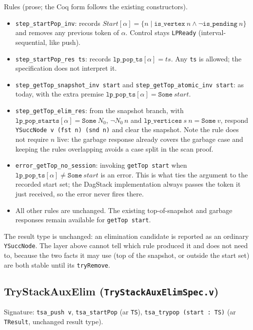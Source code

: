 \documentclass[11pt]{article}
\theoremstyle{definition}
\theoremstyle{remark}
\newcommand{\code}[1]{\texttt{#1}}
\newcommand{\file}[1]{\texttt{#1}}
\newcommand{\Start}{\mathit{Start}}
\begin{document}
Rules (prose; the Coq form follows the existing constructors).

\begin{itemize}[nosep]
\item \code{step\_startPop\_inv}: records
  $\Start[\alpha] = \{n \mid \code{is\_vertex}\ n \wedge \neg\code{is\_pending}\ n\}$
  and removes any previous token of $\alpha$. Control stays \code{LPReady}
  (interval-sequential, like push).
\item \code{step\_startPop\_res ts}: records $\code{lp\_pop\_ts}[\alpha] = ts$.
  Any \code{ts} is allowed; the specification does not interpret it.
\item \code{step\_getTop\_snapshot\_inv start} and
  \code{step\_getTop\_atomic\_inv start}: as today, with the extra premise
  $\code{lp\_pop\_ts}[\alpha] = \code{Some}\ start$.
\item \code{step\_getTop\_elim\_res}: from the snapshot branch, with
  $\code{lp\_pop\_starts}[\alpha] = \code{Some}\ N_0$,
  $\neg N_0\,n$ and $\code{lp\_vertices}\ s\ n = \code{Some}\ v$, respond
  \code{YSuccNode v (fst n) (snd n)} and clear the snapshot. Note the
  rule does not require $n$ live: the garbage response already covers the
  garbage case and keeping the rules overlapping avoids a case split in
  the scan proof.
\item \code{error\_getTop\_no\_session}: invoking \code{getTop start} when
  $\code{lp\_pop\_ts}[\alpha] \ne \code{Some}\ start$ is an error. This
  is what ties the argument to the recorded start set; the DagStack
  implementation always passes the token it just received, so the error
  never fires there.
\item All other rules are unchanged. The existing top-of-snapshot and
  garbage responses remain available for \code{getTop start}.
\end{itemize}

The result type is unchanged: an elimination candidate is reported as an
ordinary \code{YSuccNode}. The layer above cannot tell which rule produced
it and does not need to, because the two facts it may use (top of the
snapshot, or outside the start set) are both stable until its
\code{tryRemove}.

\subsection{TryStackAuxElim (\file{TryStackAuxElimSpec.v})}

Signature: \code{tsa\_push v}, \code{tsa\_startPop} (ar \code{TS}),
\code{tsa\_trypop (start : TS)} (ar \code{TResult}, unchanged result
type).
\end{document}
